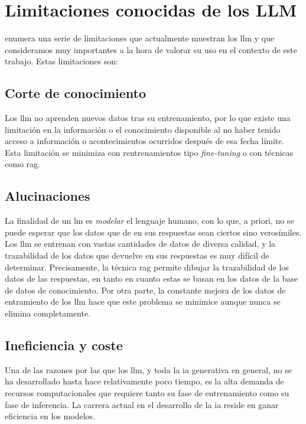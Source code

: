 \section{Limitaciones conocidas de los LLM}
\label{sec:limitaciones_llm}

\cite{arunbijiRAGVsFinetuning} enumera una serie de limitaciones que actualmente muestran los \gls{llm} y que consideramos muy importantes a la hora de valorar su uso en el contexto de este trabajo. Estas limitaciones son:

\subsection{Corte de conocimiento}

Los \gls{llm} no aprenden nuevos datos tras su entrenamiento, por lo que existe una limitación en la información o el conocimiento disponible al no haber tenido acceso a información o acontecimientos ocurridos después de esa fecha límite. Esta limitación se minimiza con rentrenamientos tipo \emph{fine-tuning} o con técnicas como \gls{rag}.

\subsection{Alucinaciones}

La finalidad de un \gls{lm} es \emph{modelar} el lenguaje humano, con lo que, a priori, no se puede esperar que los datos que de en sus respuestas sean ciertos sino verosímiles. Los \gls{llm} se entrenan con vastas cantidades de datos de diversa calidad, y la trazabilidad de los datos que devuelve en sus respuestas es muy difícil de determinar. Precisamente, la técnica \gls{rag} permite dibujar la trazabilidad de los datos de las respuestas, en tanto en cuanto estas se basan en los datos de la base de datos de conocimiento. Por otra parte, la constante mejora de los datos de entramiento de los \gls{llm} \citep{gunasekarTextbooksAreAll2023} hace que este problema se minimice aunque nunca se elimina completamente.

\subsection{Ineficiencia y coste}

Una de las razones por las que los \gls{llm}, y toda la \gls{ia} generativa en general, no se ha desarrollado hasta hace relativamente poco tiempo, es la alta demanda de recursos computacionales que requiere tanto su fase de entrenamiento como su fase de inferencia. La carrera actual en el desarrollo de la \gls{ia} reside en ganar eficiencia en los modelos. 

